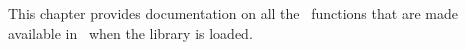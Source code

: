 This chapter provides documentation on all the \ML\ functions that are made
available in \HOL\ when the  library is loaded.
